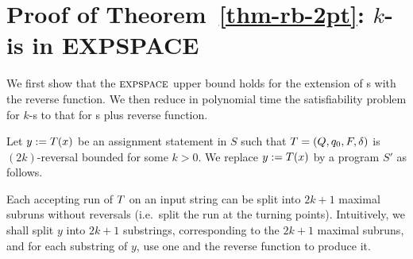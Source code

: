 
\section{Proof of Theorem~\ref{thm-rb-2pt}: $k$-\RBPPT{} is in EXPSPACE}\label{app-rb-2pt}

We first show that the $\textsc{expspace}$ upper bound holds for the extension of
\PT{}s with the reverse function.
%
%
We then reduce in polynomial time the satisfiability problem for $k$-\RBPPT{}s
to that for \PT{}s plus reverse function.

Let
$y := T(x)$
be an assignment statement in $S$ such that
$T = (Q, q_0, F, \delta)$
is $(2k)$-reversal bounded for some $k > 0$.
%
We replace $y := T(x)$ by a program $S'$ as follows.

Each accepting run of $T$ on an input string can be split into $2k+1$
maximal subruns without reversals (i.e.\ split the run at the turning points).
%
Intuitively, we shall split $y$ into $2k+1$ substrings, corresponding to the
$2k+1$ maximal subruns, and for each substring of $y$, use one \PT{} and the
reverse function to produce it.

\newcommand\init{\mathsf{init}}
\newcommand\prefix{\mathsf{prefix}}
\newcommand\suffix{\mathsf{suffix}}
\newcommand\finalpass{\mathsf{finalpass}}
\newcommand\reverse{\mathsf{reverse}}
\newcommand\concatpt{\mathsf{concat}}

